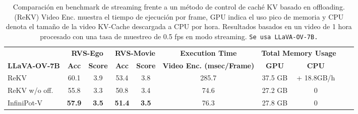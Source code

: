 \begin{table}[t]
    \small
  \centering
  \begin{tabular}{l c c c c c c c c c}
    \toprule
    & \multicolumn{2}{c}{\textbf{RVS-Ego}} & \multicolumn{2}{c}{\textbf{RVS-Movie}} & \textbf{Execution Time }
    & \multicolumn{2}{c}{\textbf{Total Memory Usage}} \\ 
    \cmidrule(lr){2-3} \cmidrule(lr){4-5} \cmidrule(lr){6-6} \cmidrule(lr){7-8}
       \textbf{LLaVA-OV-7B} & \textbf{Acc} & \textbf{Score} & \textbf{Acc} & \textbf{Score} & \textbf{Video Enc. (msec/Frame)} 
      & \textbf{GPU} & \textbf{CPU} \\
    \midrule
    ReKV                   & 60.1 & 3.9 & 53.4 & 3.8  &  285.7  & 37.5 GB & + 18.8GB/h \\ \midrule
    ReKV w/o off.       & 55.8 & 3.3 & 50.8 & 3.4  & 74.6  & 27.2 GB     & 0          \\
    InfiniPot-V                   & \textbf{57.9} & \textbf{3.5} & \textbf{51.4} & \textbf{3.5}  & 76.3  & 27.8 GB     & 0          \\
    \bottomrule
  \end{tabular}
  \vspace{2mm}
  \caption{Comparación en benchmark de streaming frente a un método de control de caché KV basado en offloading. (ReKV) Video Enc. muestra el tiempo de ejecución por frame, GPU indica el uso pico de memoria y CPU denota el tamaño de la video KV-Cache descargada a CPU por hora. Resultados basados en un video de 1 hora procesado con una tasa de muestreo de 0.5 fps en modo streaming. \texttt{Se usa LLaVA-OV-7B.}}
  \vspace{-.2in}
  \label{tab:rvs_ego_performance}
\end{table}
